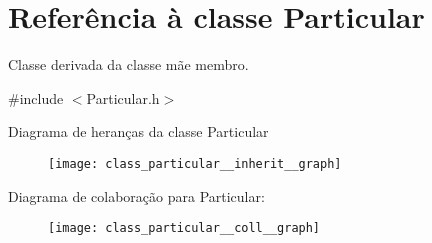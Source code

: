 \hypertarget{class_particular}{\section{Referência à classe Particular}
\label{class_particular}
}


Classe derivada da classe mãe membro.  




{\ttfamily \#include $<$Particular.\+h$>$}



Diagrama de heranças da classe Particular\nopagebreak
\begin{figure}[H]
\begin{center}
\leavevmode
\texttt{[image: class\_particular\_\_inherit\_\_graph]}
\end{center}
\end{figure}


Diagrama de colaboração para Particular\+:\nopagebreak
\begin{figure}[H]
\begin{center}
\leavevmode
\texttt{[image: class\_particular\_\_coll\_\_graph]}
\end{center}
\end{figure}
